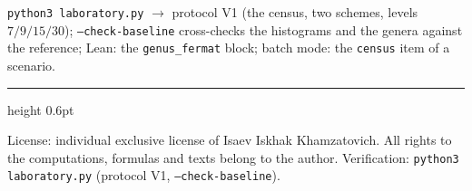 \documentclass[11pt,a4paper]{article}
\theoremstyle{plain}
\theoremstyle{definition}
\theoremstyle{remark}
\begin{document}
\begin{verifybox}
\texttt{python3 laboratory.py} $\to$ protocol V1 (the census,
two schemes, levels $7/9/15/30$); \texttt{--check-baseline}
cross-checks the histograms and the genera against the
reference; Lean: the \texttt{genus\_fermat} block; batch mode:
the \texttt{census} item of a scenario.
\end{verifybox}

\vfill
{\color{linkblue}\hrule height 0.6pt}
\vspace{0.5em}
{\small\color{gray}
License: individual exclusive license of Isaev Iskhak Khamzatovich.
All rights to the computations, formulas and texts belong to the author.
Verification: \texttt{python3 laboratory.py} (protocol V1, \texttt{--check-baseline}).
}
\end{document}
